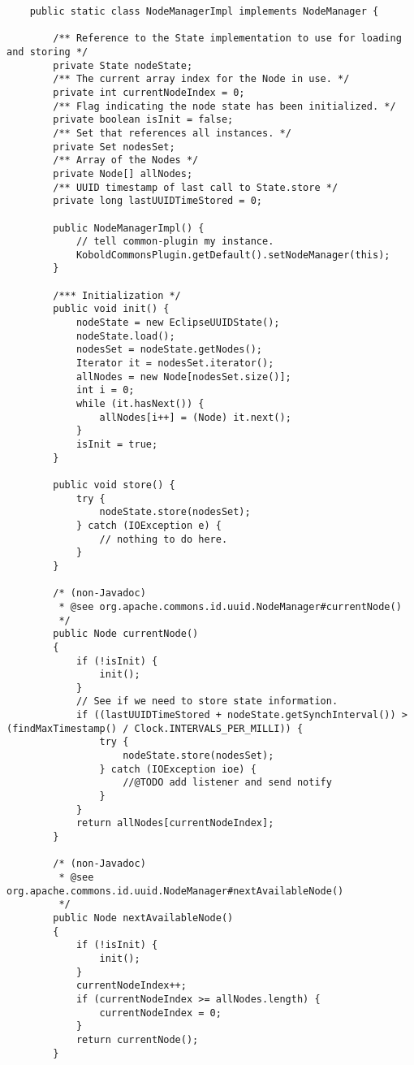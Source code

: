 \begin{verbatim}
	public static class NodeManagerImpl implements NodeManager {

	    /** Reference to the State implementation to use for loading and storing */
	    private State nodeState;
	    /** The current array index for the Node in use. */
	    private int currentNodeIndex = 0;
	    /** Flag indicating the node state has been initialized. */
	    private boolean isInit = false;
	    /** Set that references all instances. */
	    private Set nodesSet;
	    /** Array of the Nodes */
	    private Node[] allNodes;
	    /** UUID timestamp of last call to State.store */
	    private long lastUUIDTimeStored = 0;
	    
	    public NodeManagerImpl() {
	        // tell common-plugin my instance.
	        KoboldCommonsPlugin.getDefault().setNodeManager(this);
	    }
	    
	    /*** Initialization */
	    public void init() {
	        nodeState = new EclipseUUIDState();
	        nodeState.load();
	        nodesSet = nodeState.getNodes();
	        Iterator it = nodesSet.iterator();
	        allNodes = new Node[nodesSet.size()];
	        int i = 0;
	        while (it.hasNext()) {
	            allNodes[i++] = (Node) it.next();
	        }
	        isInit = true;
	    }
	    
	    public void store() {
	        try {
                nodeState.store(nodesSet);
            } catch (IOException e) {
                // nothing to do here.
            }    
	    }
	    
        /* (non-Javadoc)
         * @see org.apache.commons.id.uuid.NodeManager#currentNode()
         */
        public Node currentNode()
        {
            if (!isInit) {
                init();
            }
            // See if we need to store state information.
            if ((lastUUIDTimeStored + nodeState.getSynchInterval()) > (findMaxTimestamp() / Clock.INTERVALS_PER_MILLI)) {
                try {
                    nodeState.store(nodesSet);
                } catch (IOException ioe) {
                    //@TODO add listener and send notify
                }
            }
            return allNodes[currentNodeIndex];
        }

        /* (non-Javadoc)
         * @see org.apache.commons.id.uuid.NodeManager#nextAvailableNode()
         */
        public Node nextAvailableNode()
        {
            if (!isInit) {
                init();
            }
            currentNodeIndex++;
            if (currentNodeIndex >= allNodes.length) {
                currentNodeIndex = 0;
            }
            return currentNode();        
        }


\end{verbatim}
